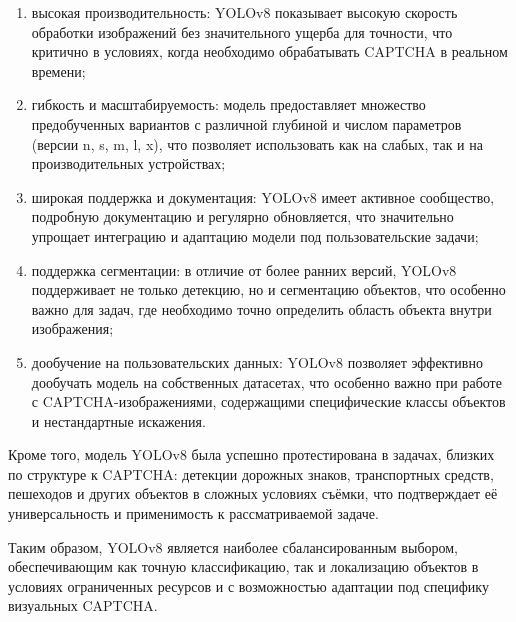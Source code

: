 \begin{enumerate}
    \item высокая производительность: YOLOv8 показывает высокую скорость обработки изображений без значительного ущерба для точности, что критично в условиях, когда необходимо обрабатывать CAPTCHA в реальном времени;
    \item гибкость и масштабируемость: модель предоставляет множество предобученных вариантов с различной глубиной и числом параметров (версии n, s, m, l, x), что позволяет использовать как на слабых, так и на производительных устройствах;
    \item широкая поддержка и документация: YOLOv8 имеет активное сообщество, подробную документацию и регулярно обновляется, что значительно упрощает интеграцию и адаптацию модели под пользовательские задачи;
    \item поддержка сегментации: в отличие от более ранних версий, YOLOv8 поддерживает не только детекцию, но и сегментацию объектов, что особенно важно для задач, где необходимо точно определить область объекта внутри изображения;
    \item дообучение на пользовательских данных: YOLOv8 позволяет эффективно дообучать модель на собственных датасетах, что особенно важно при работе с CAPTCHA-изображениями, содержащими специфические классы объектов и нестандартные искажения.
\end{enumerate}

Кроме того, модель YOLOv8 была успешно протестирована в задачах, близких по структуре к CAPTCHA: детекции дорожных знаков, транспортных средств, пешеходов и других объектов в сложных условиях съёмки, что подтверждает её универсальность и применимость к рассматриваемой задаче.

Таким образом, YOLOv8 является наиболее сбалансированным выбором, обеспечивающим как точную классификацию, так и локализацию объектов в условиях ограниченных ресурсов и с возможностью адаптации под специфику визуальных CAPTCHA.
